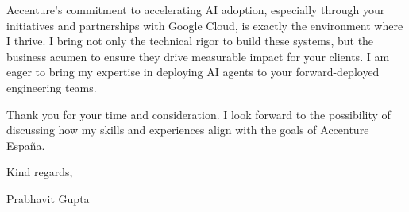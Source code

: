 \documentclass[11pt,a4paper]{article}
\begin{document}
\vspace{1em}
\noindent
Accenture's commitment to accelerating AI adoption, especially through your initiatives and partnerships with Google Cloud, is exactly the environment where I thrive. I bring not only the technical rigor to build these systems, but the business acumen to ensure they drive measurable impact for your clients. I am eager to bring my expertise in deploying AI agents to your forward-deployed engineering teams.

\vspace{1em}
\noindent
Thank you for your time and consideration. I look forward to the possibility of discussing how my skills and experiences align with the goals of Accenture Espa\~na.

\vspace{2em}
\noindent
Kind regards,

\vspace{1em}
\noindent
Prabhavit Gupta
\end{document}
